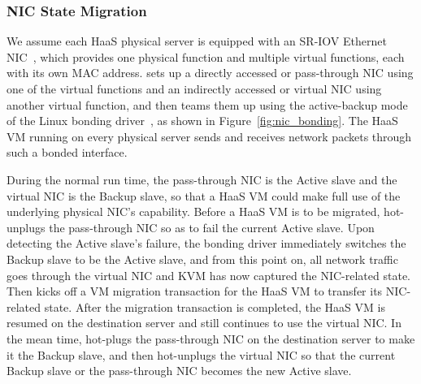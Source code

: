 \subsubsection{NIC State Migration}

We assume each HaaS physical server is equipped with an SR-IOV Ethernet NIC~\cite{dong:2008},
which provides one physical function and multiple virtual functions, each with its own MAC address.
\na sets up a directly accessed or pass-through NIC using one of the virtual functions
and an indirectly accessed or virtual NIC using another virtual function,
and then teams them up using the active-backup mode of the Linux bonding driver~\cite{bond-dri}, as shown in Figure~\ref{fig:nic_bonding}.
The HaaS VM running on every \na physical server sends and receives network packets through such a bonded interface. 


During the normal run time, the pass-through NIC is the Active slave and the virtual NIC is the Backup slave,
so that a HaaS VM could make full use of the underlying physical NIC's capability.
Before a HaaS VM is to be migrated, \na hot-unplugs the pass-through NIC so as to fail the current Active slave.
Upon detecting the Active slave's failure, the bonding driver immediately switches the Backup slave to be the Active slave,
and from this point on, all network traffic goes through the virtual NIC and KVM has now captured the NIC-related state. Then \na kicks off a VM migration transaction for the HaaS VM to transfer its NIC-related state.
After the migration transaction is completed, the HaaS VM is resumed on the destination server and still continues to use the virtual NIC.
In the mean time, \na hot-plugs the pass-through NIC on the destination  server to make it the Backup slave, and then hot-unplugs the virtual NIC so that the current Backup slave or the pass-through  NIC becomes the new Active slave.


